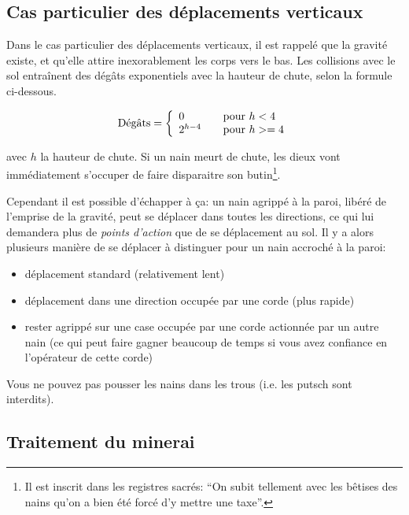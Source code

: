 \subsection{Cas particulier des déplacements verticaux}

  Dans le cas particulier des déplacements verticaux, il est rappelé que la
  gravité existe, et qu'elle attire inexorablement les corps vers le bas. Les
  collisions avec le sol entraînent des dégâts exponentiels avec la hauteur de
  chute, selon la formule ci-dessous.

  \[
    \text{Dégâts} =
    \left\{
      \begin{array}{l l}
        0         & \quad \text{pour $h < 4$}  \\
        2^{h-4} & \quad \text{pour $h >= 4$} \\
      \end{array}
    \right.
  \]

  avec $h$ la hauteur de chute. Si un nain meurt de chute, les dieux vont
  immédiatement s'occuper de faire disparaitre son butin\footnote{Il est
  inscrit dans les registres sacrés:  ``On subit tellement avec les bêtises
  des nains qu'on a bien été forcé d'y mettre une taxe''.}.

  Cependant il est possible d'échapper à ça: un nain agrippé à la paroi, libéré
  de l'emprise de la gravité, peut se déplacer dans toutes les directions, ce
  qui lui demandera plus de \textit{points d'action} que de se déplacement au
  sol. Il y a alors plusieurs manière de se déplacer à distinguer pour un nain
  accroché à la paroi:

  \begin{itemize}
    \item déplacement standard (relativement lent)
    \item déplacement dans une direction occupée par une corde (plus rapide)
    \item rester agrippé sur une case occupée par une corde actionnée par un
      autre nain (ce qui peut faire gagner beaucoup de temps si vous avez
      confiance en l'opérateur de cette corde)
  \end{itemize}

  Vous ne pouvez pas pousser les nains dans les trous (i.e. les putsch sont
  interdits).

\subsection{Traitement du minerai}

